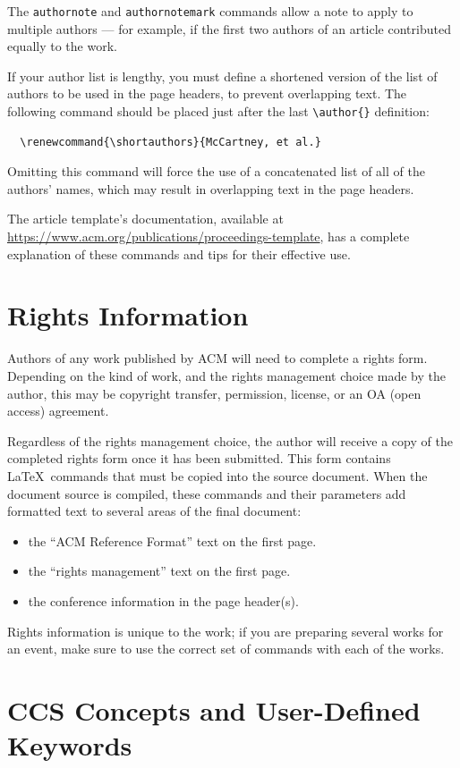 \documentclass[acmlarge,11pt]{acmart}
\begin{document}
The \verb|authornote| and \verb|authornotemark| commands allow a note
to apply to multiple authors --- for example, if the first two authors
of an article contributed equally to the work.

If your author list is lengthy, you must define a shortened version of
the list of authors to be used in the page headers, to prevent
overlapping text. The following command should be placed just after
the last \verb|\author{}| definition:
\begin{verbatim}
  \renewcommand{\shortauthors}{McCartney, et al.}
\end{verbatim}
Omitting this command will force the use of a concatenated list of all
of the authors' names, which may result in overlapping text in the
page headers.

The article template's documentation, available at
\url{https://www.acm.org/publications/proceedings-template}, has a
complete explanation of these commands and tips for their effective
use.

\section{Rights Information}

Authors of any work published by ACM will need to complete a rights
form. Depending on the kind of work, and the rights management choice
made by the author, this may be copyright transfer, permission,
license, or an OA (open access) agreement.

Regardless of the rights management choice, the author will receive a
copy of the completed rights form once it has been submitted. This
form contains \LaTeX\ commands that must be copied into the source
document. When the document source is compiled, these commands and
their parameters add formatted text to several areas of the final
document:
\begin{itemize}
\item the ``ACM Reference Format'' text on the first page.
\item the ``rights management'' text on the first page.
\item the conference information in the page header(s).
\end{itemize}

Rights information is unique to the work; if you are preparing several
works for an event, make sure to use the correct set of commands with
each of the works.

\section{CCS Concepts and User-Defined Keywords}
\end{document}
